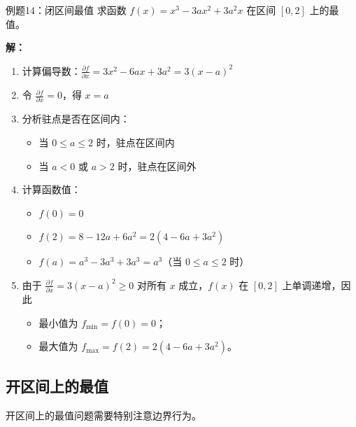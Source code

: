 \documentclass[a4paper,11pt]{ctexart}
\newcommand{\partialder}[2]{\frac{\partial #1}{\partial #2}}
\theoremstyle{definition}
\theoremstyle{remark}
\begin{document}
\begin{examplebox}{例题14：闭区间最值}
求函数 $f(x) = x^3 - 3ax^2 + 3a^2x$ 在区间 $[0,2]$ 上的最值。

\textbf{解：}
\begin{enumerate}
    \item 计算偏导数：$\partialder{f}{x} = 3x^2 - 6ax + 3a^2 = 3(x-a)^2$
    \item 令 $\partialder{f}{x} = 0$，得 $x = a$
    \item 分析驻点是否在区间内：
    \begin{itemize}
        \item 当 $0 \leq a \leq 2$ 时，驻点在区间内
        \item 当 $a < 0$ 或 $a > 2$ 时，驻点在区间外
    \end{itemize}
    \item 计算函数值：
    \begin{itemize}
        \item $f(0) = 0$
        \item $f(2) = 8 - 12a + 6a^2 = 2(4 - 6a + 3a^2)$
        \item $f(a) = a^3 - 3a^3 + 3a^3 = a^3$（当 $0 \leq a \leq 2$ 时）
    \end{itemize}
    \item 由于 $\partialder{f}{x} = 3(x-a)^2 \geq 0$ 对所有 $x$ 成立，$f(x)$ 在 $[0,2]$ 上单调递增，因此
    \begin{itemize}
        \item 最小值为 $f_{\min} = f(0) = 0$；
        \item 最大值为 $f_{\max} = f(2) = 2(4 - 6a + 3a^2)$。
    \end{itemize}
\end{enumerate}
\end{examplebox}

\subsection{开区间上的最值}

开区间上的最值问题需要特别注意边界行为。
\end{document}
